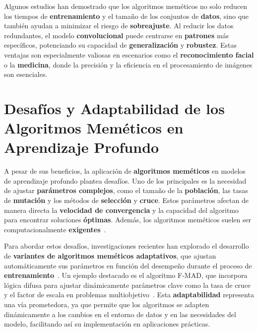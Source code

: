 Algunos estudios han demostrado que los algoritmos meméticos no solo reducen los tiempos de \textbf{entrenamiento} y el
tamaño de los conjuntos de \textbf{datos}, sino que también ayudan a minimizar el riesgo de \textbf{sobreajuste}.
Al reducir los datos redundantes, el modelo \textbf{convolucional} puede centrarse en \textbf{patrones} más
específicos, potenciando su capacidad de \textbf{generalización} y \textbf{robustez}.
Estas ventajas son especialmente valiosas en escenarios como el \textbf{reconocimiento facial} o la \textbf{medicina},
donde la precisión y la eficiencia en el procesamiento de imágenes son esenciales.


\section{Desafíos y Adaptabilidad de los Algoritmos Meméticos en Aprendizaje Profundo}
\label{sec:desafios-y-adaptabilidad-algoritmos-memeticos}
A pesar de sus beneficios, la aplicación de \textbf{algoritmos meméticos} en modelos de aprendizaje profundo plantea
desafíos.
Uno de los principales es la necesidad de ajustar \textbf{parámetros complejos}, como el tamaño de la
\textbf{población}, las tasas de \textbf{mutación} y los métodos de \textbf{selección} y \textbf{cruce}.
Estos parámetros afectan de manera directa la \textbf{velocidad de convergencia} y la capacidad del algoritmo para
encontrar soluciones \textbf{óptimas}.
Además, los algoritmos meméticos suelen ser computacionalmente \textbf{exigentes}~\cite{goldbergGeneticAlgorithmsSearch1989}.

Para abordar estos desafíos, investigaciones recientes han explorado el desarrollo de
\textbf{variantes de algoritmos meméticos adaptativos}, que ajustan automáticamente sus parámetros en función del
desempeño durante el proceso de \textbf{entrenamiento}~\cite{molinaMASWChainsMemeticAlgorithm2010}.
Un ejemplo destacado es el algoritmo F-MAD, que incorpora lógica difusa para ajustar dinámicamente
parámetros clave como la tasa de cruce y el factor de escala en problemas multiobjetivo~\cite{subburajFuzzySystemBased2025}.
Esta \textbf{adaptabilidad} representa una vía prometedora, ya que permite que los algoritmos se adapten dinámicamente
a los cambios en el entorno de datos y en las necesidades del modelo, facilitando así su implementación en aplicaciones
prácticas.



